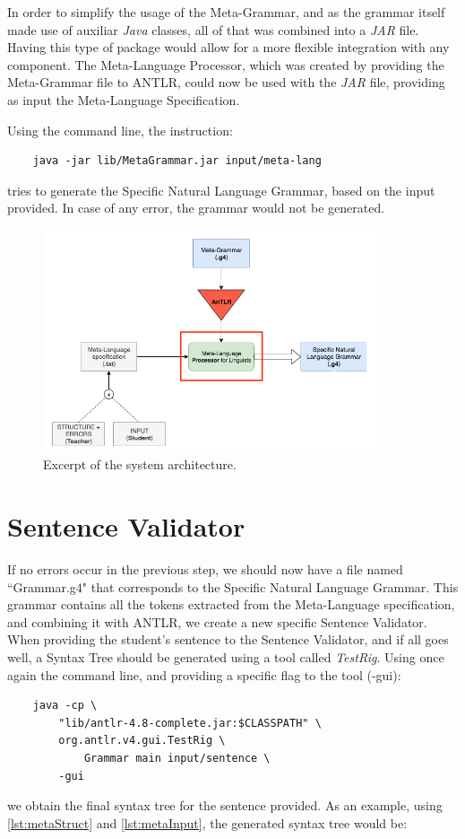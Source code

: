 In order to simplify the usage of the Meta-Grammar, and as the grammar itself made use of auxiliar \emph{Java} classes, all of that was combined into a \emph{JAR} file.
Having this type of package would allow for a more flexible integration with any component.
The Meta-Language Processor, which was created by providing the Meta-Grammar file to ANTLR, could now be used with the \emph{JAR} file, 
providing as input the Meta-Language Specification. 

Using the command line, the instruction:
\begin{Verbatim}
	java -jar lib/MetaGrammar.jar input/meta-lang
\end{Verbatim}
\noindent tries to generate the Specific Natural Language Grammar, based on the input provided. In case of any error, the grammar would not be generated.

\begin{figure}[h]
    \centering
    \includegraphics[width=10cm]{images/system_meta_processor.png}
    \caption{Excerpt of the system architecture.}
    \label{fig:system_architecture}
\end{figure}

\section{Sentence Validator}

If no errors occur in the previous step, we should now have a file named ``Grammar.g4" that corresponds to the Specific Natural Language Grammar.
This grammar contains all the tokens extracted from the Meta-Language specification, and combining it with ANTLR, we create a new specific Sentence Validator.
When providing the student's sentence to the Sentence Validator, and if all goes well, a Syntax Tree should be generated using a tool called \emph{TestRig}.
Using once again the command line, and providing a specific flag to the tool (-gui):
\begin{Verbatim}
	java -cp \ 
		"lib/antlr-4.8-complete.jar:$CLASSPATH" \ 
		org.antlr.v4.gui.TestRig \ 
			Grammar main input/sentence \ 
		-gui
\end{Verbatim}
\noindent we obtain the final syntax tree for the sentence provided. 
As an example, using \autoref{lst:metaStruct} and \autoref{lst:metaInput}, the generated syntax tree would be:

